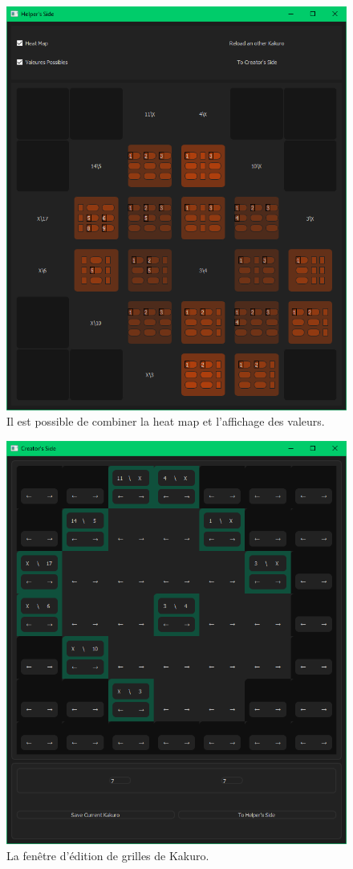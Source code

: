 \documentclass[french,12pt]{article}
\begin{document}
\begin{figure}[ht]
  \begin{center}
    \includegraphics[width=\textwidth]{./ressources/aideMax.png} 
  \end{center}
  \caption{Il est possible de combiner la heat map et l'affichage des valeurs.}
\end{figure}

\begin{figure}[ht]
  \begin{center}
    \includegraphics[width=\textwidth]{./ressources/creator.png} 
  \end{center}
  \caption{La fenêtre d'édition de grilles de Kakuro.}
\end{figure}
\end{document}
